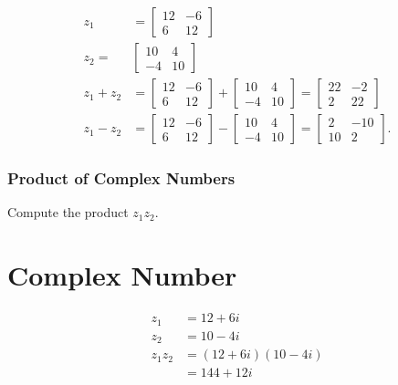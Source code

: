 \documentclass[10pt]{article}
\begin{document}
$$
\begin{aligned}
z_{1} & =\left[\begin{array}{cc}
12 & -6 \\
6 & 12
\end{array}\right] \\
z_{2}= & {\left[\begin{array}{cc}
10 & 4 \\
-4 & 10
\end{array}\right] } \\
z_{1}+z_{2} & =\left[\begin{array}{cc}
12 & -6 \\
6 & 12
\end{array}\right]+\left[\begin{array}{cc}
10 & 4 \\
-4 & 10
\end{array}\right]=\left[\begin{array}{cc}
22 & -2 \\
2 & 22
\end{array}\right] \\
z_{1}-z_{2} & =\left[\begin{array}{cc}
12 & -6 \\
6 & 12
\end{array}\right]-\left[\begin{array}{cc}
10 & 4 \\
-4 & 10
\end{array}\right]=\left[\begin{array}{cc}
2 & -10 \\
10 & 2
\end{array}\right] .
\end{aligned}
$$

\subsubsection{Product of Complex Numbers}
Compute the product $z_{1} z_{2}$.

\section{Complex Number}
$$
\begin{aligned}
z_{1} & =12+6 i \\
z_{2} & =10-4 i \\
z_{1} z_{2} & =(12+6 i)(10-4 i) \\
& =144+12 i
\end{aligned}
$$
\end{document}
